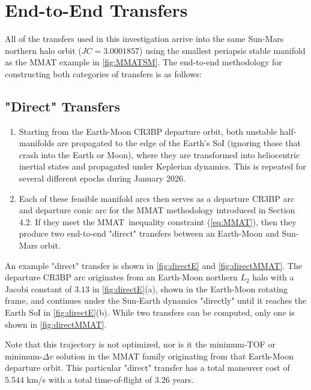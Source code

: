 \section{End-to-End Transfers}
All of the transfers used in this investigation arrive into the same Sun-Mars northern halo orbit
($JC=3.0001857$) using the smallest periapsis stable manifold as the MMAT example in
\cref{fig:MMATSM}. The end-to-end methodology for constructing both categories of transfers is as
follows:

\subsection{"Direct" Transfers}
\begin{enumerate}
    \item   Starting from the Earth-Moon CR3BP departure orbit, both unstable half-manifolds are
            propagated to the edge of the Earth's SoI (ignoring those that crash into the Earth or
            Moon), where they are transformed into heliocentric inertial states and propagated
            under Keplerian dynamics. This is repeated for several different epochs during January
            2026.
    \item   Each of these feasible manifold arcs then serves as a departure CR3BP arc and departure
            conic arc for the MMAT methodology introduced in Section 4.2. If they meet the MMAT\
            inequality constraint (\cref{eq:MMAT}), then they produce two end-to-end "direct"
            transfers between an Earth-Moon and Sun-Mars orbit.
\end{enumerate}

An example "direct" transfer is shown in \cref{fig:directE} and \cref{fig:directMMAT}. The
departure CR3BP arc originates from an Earth-Moon northern $L_{2}$ halo with a Jacobi constant of
$3.13$ in \cref{fig:directE}(a), shown in the Earth-Moon rotating frame, and continues under the
Sun-Earth dynamics "directly" until it reaches the Earth SoI in \cref{fig:directE}(b). While two
transfers can be computed, only one is shown in \cref{fig:directMMAT}.

Note that this trajectory is not optimized, nor is it the minimum-TOF or minimum-$\Delta v$
solution in the MMAT family originating from that Earth-Moon departure orbit. This particular
"direct" transfer has a total maneuver cost of $5.544$ km/s with a total time-of-flight of $3.26$
years.

